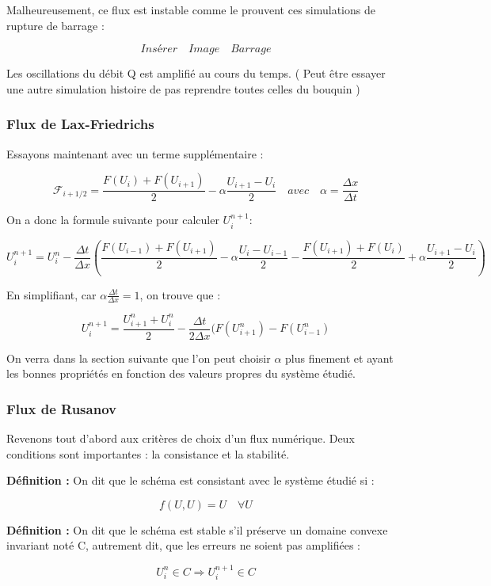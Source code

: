\documentclass[
11pt, %
francais, %
singlespacing, %
headsepline, %
]{MastersDoctoralThesis} %
\begin{document}
Malheureusement, ce flux est instable comme le prouvent ces simulations de rupture de barrage :

$$ Insérer \quad Image \quad Barrage $$

Les oscillations du débit Q est amplifié au cours du temps. ( Peut être essayer une autre simulation histoire de pas reprendre toutes celles du bouquin )

\subsubsection{Flux de Lax-Friedrichs}

Essayons maintenant avec un terme supplémentaire :

$$ \mathcal{F}_{i+1/2} = \frac{F(U_i) + F(U_{i+1})}{2} - \alpha \frac{U_{i+1} - U_i}{2} \quad avec \quad \alpha = \frac{\Delta x}{\Delta t}$$

On a donc la formule suivante pour calculer $U_i ^{n+1}$:

$$ U_i ^{n+1} = U_i ^{n}  - \frac{\Delta t}{\Delta x} ( \frac{F(U_{i-1}) + F(U_{i+1})}{2} - \alpha \frac{U_i - U_{i-1}}{2} - \frac{F(U_{i+1}) + F(U_i)}{2} + \alpha \frac{U_{i+1} - U_i}{2} ) $$

En simplifiant, car $ \alpha \frac{\Delta t}{\Delta x} = 1 $, on trouve que :

$$ U_i ^{n+1} = \frac{U_{i+1} ^{n} + U_i ^{n}}{2}  - \frac{\Delta t}{2 \Delta x} ( F(U_{i+1} ^n ) - F(U_{i-1} ^n ) $$

On verra dans la section suivante que l'on peut choisir $\alpha$ plus finement et ayant les bonnes propriétés en fonction des valeurs propres du système étudié.

\subsubsection{Flux de Rusanov}

Revenons tout d'abord aux critères de choix d'un flux numérique. Deux conditions sont importantes : la consistance et la stabilité.

\textbf{Définition :} On dit que le schéma est consistant avec le système étudié si :

$$ f(U,U) = U \quad \forall U $$ 

\textbf{Définition :} On dit que le schéma est stable s'il préserve un domaine convexe invariant noté C, autrement dit, que les erreurs ne soient pas amplifiées :

$$ U_i ^n \in C \Rightarrow U_i ^{n+1} \in C  $$
\end{document}
